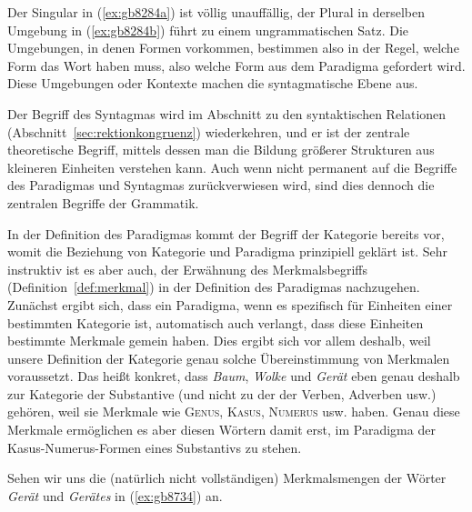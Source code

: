 Der Singular in (\ref{ex:gb8284a}) ist völlig unauffällig, der Plural in derselben Umgebung in (\ref{ex:gb8284b}) führt zu einem ungrammatischen Satz.
Die Umgebungen, in denen Formen vorkommen, bestimmen also in der Regel, welche Form das Wort haben muss, also welche Form aus dem Paradigma gefordert wird.
Diese Umgebungen oder Kontexte machen die syntagmatische Ebene aus.


Der Begriff des Syntagmas wird im Abschnitt zu den syntaktischen Relationen (Abschnitt~\ref{sec:rektionkongruenz}) wiederkehren, und er ist der zentrale theoretische Begriff, mittels dessen man die Bildung größerer Strukturen aus kleineren Einheiten verstehen kann.
Auch wenn nicht permanent auf die Begriffe des Paradigmas und Syntagmas zurückverwiesen wird, sind dies dennoch die zentralen Begriffe der Grammatik.


In der Definition des Paradigmas kommt der Begriff der Kategorie bereits vor, womit die Beziehung von Kategorie und Paradigma prinzipiell geklärt ist.
Sehr instruktiv ist es aber auch, der Erwähnung des Merkmalsbegriffs (Definition~\ref{def:merkmal}) in der Definition des Paradigmas nachzugehen.
Zunächst ergibt sich, dass ein Paradigma, wenn es spezifisch für Einheiten einer bestimmten Kategorie ist, automatisch auch verlangt, dass diese Einheiten bestimmte Merkmale gemein haben.
Dies ergibt sich vor allem deshalb, weil unsere Definition der Kategorie genau solche Übereinstimmung von Merkmalen voraussetzt.
Das heißt konkret, dass \zB \textit{Baum}, \textit{Wolke} und \textit{Gerät} eben genau deshalb zur Kategorie der Substantive (und nicht zu der der Verben, Adverben usw.) gehören, weil sie Merkmale wie \textsc{Genus}, \textsc{Kasus}, \textsc{Numerus} usw. haben.
Genau diese Merkmale ermöglichen es aber diesen Wörtern damit erst, im Paradigma der Kasus-Numerus-Formen eines Substantivs zu stehen.

Sehen wir uns die (natürlich nicht vollständigen) Merkmalsmengen der Wörter \textit{Gerät} und \textit{Gerätes} in (\ref{ex:gb8734}) an.

\begin{exe}
  \ex\label{ex:gb8734}
  \begin{xlist}
  \end{xlist}
\end{exe}

